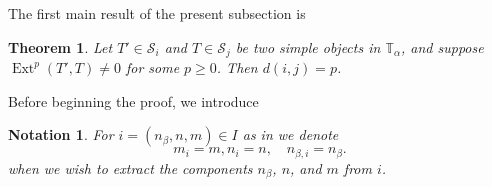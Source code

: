 \documentclass[11pt]{article}
\theoremstyle{plain}
\newtheorem{theorem}[lemma]{Theorem}
\theoremstyle{nonumberplain}
\theoremstyle{plain}
\newtheorem{notation}[lemma]{Notation}
\theoremstyle{nonumberplain}
\newcommand\bT{\mathbb T}
\newcommand\cS{\mathcal S}
\DeclareMathOperator{\ext}{\mathrm{Ext}}
\DeclareMathOperator{\soc}{\mathrm{soc}}
\begin{document}

%



The first main result of the present subsection is


\begin{theorem}\label{th.exts}
  Let $T'\in \cS_i$ and $T\in \cS_j$ be two simple objects in
  $\bT_\alpha$, and suppose $\ext^p(T',T)\ne 0$ for some $p\ge
  0$. Then $d(i,j)=p$.
\end{theorem}



Before beginning the proof, we introduce


\begin{notation}\label{not.ni}
  For $i=(n_\beta,n,m)\in I$ as in  we denote
  \begin{equation*}
    {m_i = m}, n_i=n,\quad n_{\beta,i} = n_\beta. 
  \end{equation*}
  when we wish to extract the components $n_\beta$, $n$, and $m$ from $i$.
\end{notation}
\end{document}
